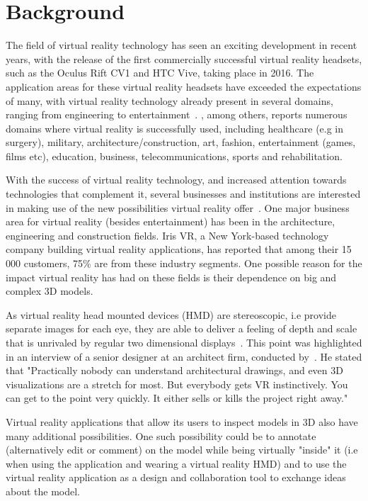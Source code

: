 \section{Background}           
The field of virtual reality technology has seen an exciting development in recent years, 
with the release of the first commercially successful virtual reality headsets, such as the Oculus Rift CV1 and HTC Vive, taking place in 2016.
The application areas for these virtual reality headsets have exceeded the expectations of many, with virtual reality 
technology already present in several domains, ranging from engineering to entertainment~\citep{VRS2016}. 
\citet{VRS2016}, among others, reports numerous domains where virtual reality is successfully used, including 
healthcare (e.g in surgery), military, architecture/construction, art, fashion, entertainment (games, films etc), education, business, telecommunications, sports and rehabilitation.

With the success of virtual reality technology, and increased attention towards technologies that complement it, several businesses and institutions 
are interested in making use of the new possibilities virtual reality offer~\citep{TW22016}. One major business area for virtual reality (besides entertainment)
has been in the architecture, engineering and construction fields. Iris VR, a New York-based technology company building virtual reality applications, has reported that
among their 15 000 customers, 75\% are from these industry segments. One possible reason for the impact virtual reality has had on these fields is their dependence 
on big and complex 3D models. 

As virtual reality head mounted devices (HMD) are stereoscopic, i.e provide separate images for each eye, they are able to deliver a feeling of 
depth and scale that is unrivaled by regular two dimensional displays~\citep{POLYGON2016}. This point was highlighted in an interview of a senior designer at an architect 
firm, conducted by~\citet{TW22016}. He stated that "Practically nobody can understand architectural drawings, and even 3D visualizations are a stretch for most. 
But everybody gets VR instinctively. You can get to the point very quickly. It either sells or kills the project right away." 

Virtual reality applications that allow its users to inspect models in 3D also have many additional possibilities. 
One such possibility could be to annotate (alternatively edit or comment) on the model while being virtually "inside" it 
(i.e when using the application and wearing a virtual reality HMD) and 
to use the virtual reality application as a design and collaboration tool to exchange ideas about the model.

